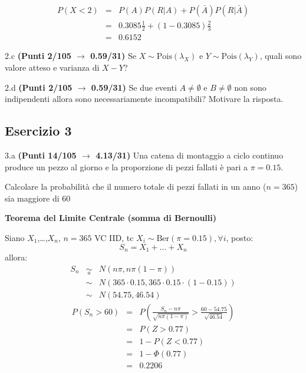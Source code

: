 \documentclass[
  11pt,
]{book}
\theoremstyle{mytheoremstyle}
\theoremstyle{mydefstyle}
\newenvironment{sol}
  {
  \begin{tcolorbox}[enhanced,breakable,arc=0.1mm,boxrule=1pt,colback=white,colframe=iblue,
  title=\bf \fontfamily{lmss}\selectfont \hspace{.5 cm} Soluzione,drop fuzzy shadow]

}{
\end{tcolorbox}
  }
\begin{document}
\begin{sol}
\begin{eqnarray*}
P(X<2) &=& P(A)P(R|A)+P(\bar A)P(R|\bar A)\\
&=& 0.3085\frac 12 + (1-0.3085)\frac 23\\
&=& 0.6152
\end{eqnarray*}

\end{sol}

2.c \textbf{(Punti 2/105 \(\rightarrow\) 0.59/31)} Se \(X\sim\text{Pois}(\lambda_X)\) e \(Y\sim\text{Pois}(\lambda_Y)\), quali sono valore atteso e varianza
di \(X-Y\)?

2.d \textbf{(Punti 2/105 \(\rightarrow\) 0.59/31)} Se due eventi \(A\ne\emptyset\) e \(B\ne\emptyset\) non sono indipendenti allora sono necessariamente incompatibili? Motivare la risposta.

\subsection{Esercizio 3}\label{esercizio-3-30}

3.a \textbf{(Punti 14/105 \(\rightarrow\) 4.13/31)} Una catena di montaggio a ciclo continuo produce un pezzo al giorno e la proporzione di pezzi fallati è pari
a \(\pi=0.15\).

Calcolare la probabilità che il numero totale di pezzi fallati in un anno (\(n=365\)) sia maggiore di 60

\begin{sol}
\textbf{Teorema del Limite Centrale (somma di Bernoulli)}

Siano \(X_1\),\ldots,\(X_n\), \(n=365\) VC IID, tc \(X_i\sim\text{Ber}(\pi=0.15)\)\(,\forall i\), posto:
\[
      S_n = X_1 + ... + X_n
      \]
allora:\begin{eqnarray*}
  S_n & \mathop{\sim}\limits_{a}& N(n\pi,n\pi(1-\pi)) \\
      &\sim & N(365\cdot0.15,365\cdot0.15\cdot(1-0.15)) \\
      &\sim & N(54.75,46.54)
  \end{eqnarray*}\begin{eqnarray*}
      P( S_n   >   60 ) 
        &=& P\left(  \frac { S_n  -  n\pi }{ \sqrt{n\pi(1-\pi)} }  >  \frac { 60  -  54.75 }{\sqrt{ 46.54 }} \right)  \\
                 &=& P\left(  Z   >   0.77 \right) \\    &=& 1-P(Z< 0.77 )\\ 
                 &=&  1-\Phi( 0.77 ) \\ &=&  0.2206 
      \end{eqnarray*}

\end{sol}
\end{document}
